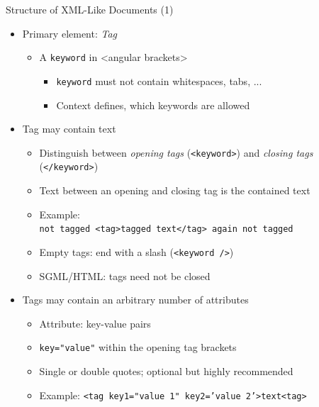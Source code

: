 \begin{frame}{Structure of XML-Like Documents (1)}
%
\begin{itemize}
\item Primary element: \emph{Tag}
	\begin{itemize}
	\item A \texttt{keyword} in <angular brackets>
		\begin{itemize}
		\item \texttt{keyword} must not contain whitespaces, tabs, ...
		\item Context defines, which keywords are allowed
		\end{itemize}
	\end{itemize}
\pause
\item Tag may contain text
	\begin{itemize}
	\item Distinguish between \emph{opening tags} (\texttt{<keyword>}) and \emph{closing tags} (\texttt{<{\color{red}/}keyword>})
	\item Text between an opening and closing tag is the contained text
	\item Example:\\
		\texttt{not tagged <tag>tagged text</tag> again not tagged}
	\item Empty tags: end with a slash (\texttt{<keyword {\color{red}/}>})
	\item SGML/HTML: tags need not be closed
	\end{itemize}
\pause
\item Tags may contain an arbitrary number of attributes
	\begin{itemize}
	\item Attribute: key-value pairs
	\item \texttt{key="value"} within the opening tag brackets
	\item Single or double quotes; optional but highly recommended
	\item Example:
		\texttt{<tag key1="value 1" key2='value 2'>text<tag>}
	\end{itemize}
\end{itemize}
%
\end{frame}


